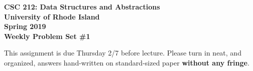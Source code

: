 \documentclass[11pt]{article}
\begin{document}
\thispagestyle{empty}

\begin{center}
    {\Large\bf CSC 212: Data Structures and Abstractions}\\
    \medskip
    {\Large\bf University of Rhode Island}\\
    \bigskip
    {\Large\bf Spring 2019}\\
    \bigskip
    {\Large\bf Weekly Problem Set \#1}
\end{center}

\vspace{25pt}

This assignment is due Thursday 2/7 before lecture.  Please turn in neat, and organized, answers hand-written on standard-sized paper {\bf without any fringe}.
\end{document}
